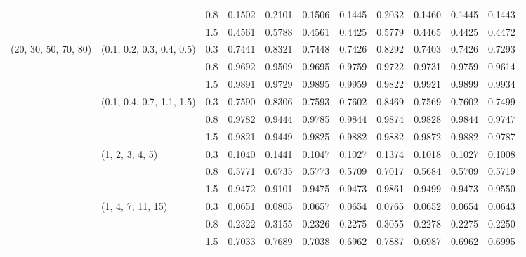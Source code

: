 \begin{table}[h]
\begin{tabular}{lllllllllll}
                     		&                           		& 0.8   	& 0.1502 	& 0.2101 	& 0.1506 	& 0.1445 	& 0.2032 	& 0.1460 	& 0.1445 	& 0.1443 \\
                     		&                           		& 1.5   	& 0.4561 	& 0.5788 	& 0.4561 	& 0.4425 	& 0.5779 	& 0.4465 	& 0.4425 	& 0.4472 \\\hline
(20, 30, 50, 70, 80) 	& (0.1, 0.2, 0.3, 0.4, 0.5) 	& 0.3   	& 0.7441 	& 0.8321 	& 0.7448 	& 0.7426 	& 0.8292 	& 0.7403 	& 0.7426 	& 0.7293 \\
                     		&                           		& 0.8   	& 0.9692 	& 0.9509 	& 0.9695 	& 0.9759 	& 0.9722 	& 0.9731 	& 0.9759 	& 0.9614 \\
                     		&                           		& 1.5   	& 0.9891 	& 0.9729 	& 0.9895 	& 0.9959 	& 0.9822 	& 0.9921 	& 0.9899 	& 0.9934 \\
                     		& (0.1, 0.4, 0.7, 1.1, 1.5) 	& 0.3   	& 0.7590 	& 0.8306 	& 0.7593 	& 0.7602 	& 0.8469 	& 0.7569 	& 0.7602 	& 0.7499 \\
                     		&                           		& 0.8   	& 0.9782 	& 0.9444 	& 0.9785 	& 0.9844 	& 0.9874 	& 0.9828 	& 0.9844 	& 0.9747 \\
                     		&                           		& 1.5   	& 0.9821 	& 0.9449 	& 0.9825 	& 0.9882 	& 0.9882 	& 0.9872 	& 0.9882 	& 0.9787 \\
                     		& (1, 2, 3, 4, 5)           	& 0.3   	& 0.1040 	& 0.1441 	& 0.1047 	& 0.1027 	& 0.1374 	& 0.1018 	& 0.1027 	& 0.1008 \\
                     		&                           		& 0.8   	& 0.5771 	& 0.6735 	& 0.5773 	& 0.5709 	& 0.7017 	& 0.5684 	& 0.5709 	& 0.5719 \\
                     		&                           		& 1.5   	& 0.9472 	& 0.9101 	& 0.9475 	& 0.9473 	& 0.9861 	& 0.9499 	& 0.9473 	& 0.9550 \\
                     		& (1, 4, 7, 11, 15)		& 0.3   	& 0.0651 	& 0.0805 	& 0.0657 	& 0.0654	& 0.0765 	& 0.0652 	& 0.0654 	& 0.0643 \\
                     		&                           		& 0.8   	& 0.2322 	& 0.3155 	& 0.2326 	& 0.2275 	& 0.3055 	& 0.2278 	& 0.2275 	& 0.2250 \\
                     		&                           		& 1.5   	& 0.7033 	& 0.7689 	& 0.7038 	& 0.6962 	& 0.7887 	& 0.6987 	& 0.6962 	& 0.6995 \\\toprule
\end{tabular}
\label{tab2}
\end{table}


